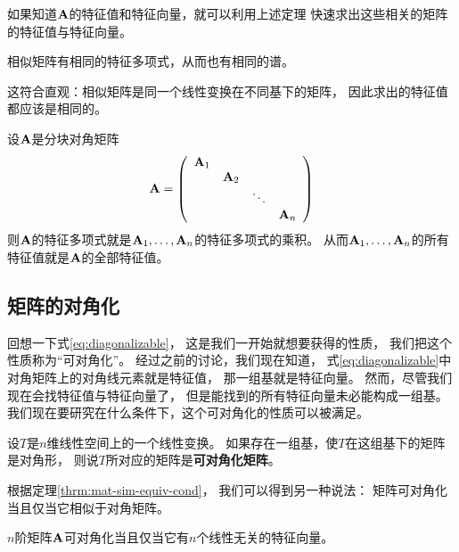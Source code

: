 \begin{remark}
  如果知道$\mmA$的特征值和特征向量，就可以利用上述定理
  快速求出这些相关的矩阵的特征值与特征向量。
\end{remark}

\begin{theorem}[相似矩阵之间特征值的联系]
  相似矩阵有相同的特征多项式，从而也有相同的谱。
\end{theorem}

\begin{remark}
  这符合直观：相似矩阵是同一个线性变换在不同基下的矩阵，
  因此求出的特征值都应该是相同的。
\end{remark}

\begin{theorem}[分块对角矩阵的特征值]
  设$\mmA$是分块对角矩阵
  \begin{displaymath}
    \mmA = \mmat{cccc}{
      \mmA_1 & & & \\
      & \mmA_2 & & \\
      & & \ddots & \\
      & & & \mmA_n }
  \end{displaymath}
  则$\mmA$的特征多项式就是$\mmA_1,\dots,\mmA_n$的特征多项式的乘积。
  从而$\mmA_1,\dots,\mmA_n$的所有特征值就是$\mmA$的全部特征值。
\end{theorem}

\subsection{矩阵的对角化}
回想一下式\eqref{eq:diagonalizable}，
这是我们一开始就想要获得的性质，
我们把这个性质称为``可对角化''。
经过之前的讨论，我们现在知道，
式\eqref{eq:diagonalizable}中对角矩阵上的对角线元素就是特征值，
那一组基就是特征向量。
然而，尽管我们现在会找特征值与特征向量了，
但是能找到的所有特征向量未必能构成一组基。
我们现在要研究在什么条件下，这个可对角化的性质可以被满足。

\begin{definition}[可对角化的矩阵]
  设$T$是$n$维线性空间上的一个线性变换。
  如果存在一组基，使$T$在这组基下的矩阵是对角形，
  则说$T$所对应的矩阵是\textbf{可对角化矩阵}。
\end{definition}

\begin{remark}
  根据定理\ref{thrm:mat-sim-equiv-cond}，
  我们可以得到另一种说法：
  矩阵可对角化当且仅当它相似于对角矩阵。
\end{remark}

\begin{theorem}[矩阵可对角化的充要条件]
  $n$阶矩阵$\mmA$可对角化当且仅当它有$n$个线性无关的特征向量。
\end{theorem}


